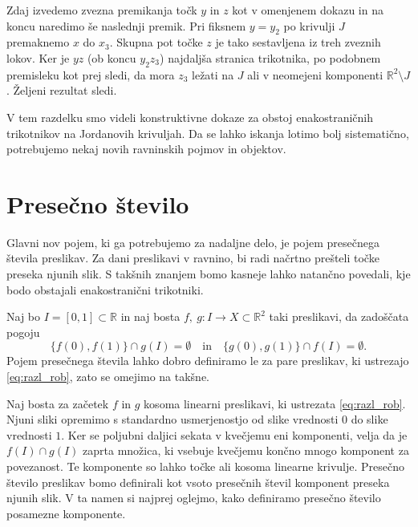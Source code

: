\documentclass[mat1]{fmfdelo}
\newcommand{\R}{\mathbb R}
\begin{document}
Zdaj izvedemo zvezna premikanja točk $y$ in $z$ kot v omenjenem dokazu in na koncu naredimo še naslednji premik. Pri fiksnem $y = y_2$ po krivulji $J$ premaknemo $x$ do $x_3$. Skupna pot točke $z$ je tako sestavljena iz treh zveznih lokov. Ker je $yz$ (ob koncu $y_2z_3$) najdaljša stranica trikotnika, po podobnem premisleku kot prej sledi, da mora $z_3$ ležati na $J$ ali v neomejeni komponenti $\R^2 \setminus J$. Željeni rezultat sledi.
\endproof

V tem razdelku smo videli konstruktivne dokaze za obstoj enakostraničnih trikotnikov na Jordanovih krivuljah. Da se lahko iskanja lotimo bolj sistematično, potrebujemo nekaj novih ravninskih pojmov in objektov.


\section{Presečno število}\label{razd:presecno}
Glavni nov pojem, ki ga potrebujemo za nadaljne delo, je pojem presečnega števila preslikav. Za dani preslikavi v ravnino, bi radi načrtno prešteli točke preseka njunih slik. S takšnih znanjem bomo kasneje lahko natančno povedali, kje bodo obstajali enakostranični trikotniki.

Naj bo $I = [0, 1] \subset \R$ in naj bosta $f,\ g \colon I \to X \subset \R^2$ taki preslikavi, da zadoščata pogoju
\begin{equation}\label{eq:razl_rob}
\{f(0), f(1)\} \cap g(I) = \emptyset \quad \text{in} \quad \{g(0), g(1)\} \cap f(I) = \emptyset.
\end{equation}
Pojem presečnega števila lahko dobro definiramo le za pare preslikav, ki ustrezajo \eqref{eq:razl_rob}, zato se omejimo na takšne.

Naj bosta za začetek $f$ in $g$ kosoma linearni preslikavi, ki ustrezata \eqref{eq:razl_rob}. Njuni sliki opremimo s standardno usmerjenostjo od slike vrednosti $0$ do slike vrednosti $1$. Ker se poljubni daljici sekata v kvečjemu eni komponenti, velja da je $f(I) \cap g(I)$ zaprta množica, ki vsebuje kvečjemu končno mnogo komponent za povezanost. Te komponente so lahko točke ali kosoma linearne krivulje. Presečno število preslikav bomo definirali kot vsoto presečnih števil komponent preseka njunih slik. V ta namen si najprej oglejmo, kako definiramo presečno število posamezne komponente.
\end{document}
